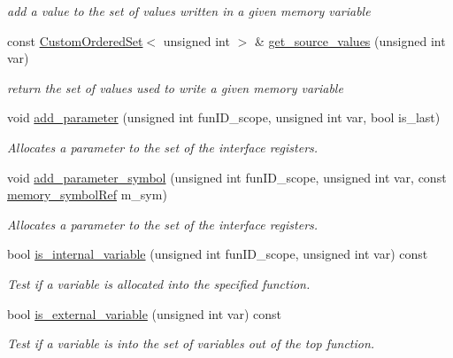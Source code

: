 \begin{DoxyCompactItemize}
\begin{DoxyCompactList}\small\item\em add a value to the set of values written in a given memory variable \end{DoxyCompactList}\item 
const \hyperlink{classCustomOrderedSet}{Custom\+Ordered\+Set}$<$ unsigned int $>$ \& \hyperlink{classmemory_a8a53cddf47d035cb68621156d6ce45c4}{get\+\_\+source\+\_\+values} (unsigned int var)
\begin{DoxyCompactList}\small\item\em return the set of values used to write a given memory variable \end{DoxyCompactList}\item 
void \hyperlink{classmemory_a6857ec6eab958a0a108f12c6e28d994b}{add\+\_\+parameter} (unsigned int fun\+I\+D\+\_\+scope, unsigned int var, bool is\+\_\+last)
\begin{DoxyCompactList}\small\item\em Allocates a parameter to the set of the interface registers. \end{DoxyCompactList}\item 
void \hyperlink{classmemory_ae85e2b58d571e54800c0effee384a2b2}{add\+\_\+parameter\+\_\+symbol} (unsigned int fun\+I\+D\+\_\+scope, unsigned int var, const \hyperlink{memory__symbol_8hpp_af3608dbc27177447c2d777fa712cc82a}{memory\+\_\+symbol\+Ref} m\+\_\+sym)
\begin{DoxyCompactList}\small\item\em Allocates a parameter to the set of the interface registers. \end{DoxyCompactList}\item 
bool \hyperlink{classmemory_af55ea4821a53abef7a412425aa50467c}{is\+\_\+internal\+\_\+variable} (unsigned int fun\+I\+D\+\_\+scope, unsigned int var) const
\begin{DoxyCompactList}\small\item\em Test if a variable is allocated into the specified function. \end{DoxyCompactList}\item 
bool \hyperlink{classmemory_a01bcc5c735b622564c5a2498d3547300}{is\+\_\+external\+\_\+variable} (unsigned int var) const
\begin{DoxyCompactList}\small\item\em Test if a variable is into the set of variables out of the top function. \end{DoxyCompactList}\item 

\end{DoxyCompactItemize}

